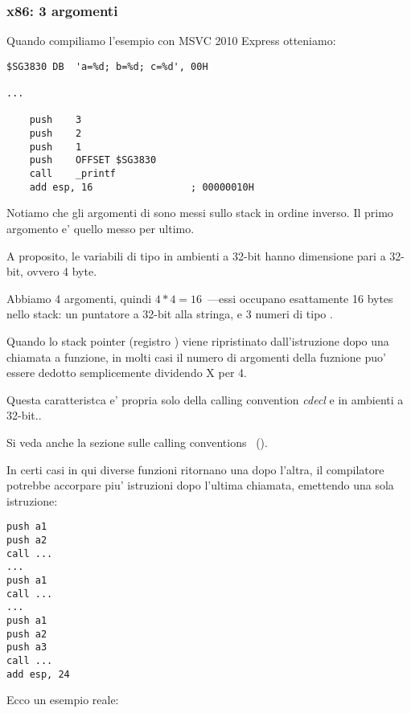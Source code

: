 \subsubsection{x86: 3 argomenti}


Quando compiliamo l'esempio con MSVC 2010 Express otteniamo:

\begin{lstlisting}[style=customasmx86]
$SG3830	DB	'a=%d; b=%d; c=%d', 00H

...

	push	3
	push	2
	push	1
	push	OFFSET $SG3830
	call	_printf
	add	esp, 16					; 00000010H
\end{lstlisting}

Notiamo che gli argomenti di \printf sono messi sullo stack in ordine inverso. Il primo argomento e' quello messo per ultimo.

A proposito, le variabili di tipo \Tint in ambienti a 32-bit hanno dimensione pari a 32-bit, ovvero 4 byte.

Abbiamo 4 argomenti, quindi $4*4 = 16$~---essi occupano esattamente 16 bytes nello stack: un puntatore a 32-bit alla stringa,  e 3 numeri di tipo \Tint.

Quando lo \gls{stack pointer} (registro \ESP) viene ripristinato dall'istruzione 
dopo una chiamata a funzione, in molti casi il numero di argomenti della fuznione puo' essere dedotto semplicemente dividendo X per 4.

Questa caratteristca  e' propria solo della calling convention \emph{cdecl} e in ambienti a 32-bit..

Si veda anche la sezione sulle calling conventions ~().

In certi casi in qui diverse funzioni ritornano una dopo l'altra, il compilatore potrebbe accorpare piu' istruzioni  
dopo l'ultima chiamata, emettendo una sola istruzione:

\begin{lstlisting}[style=customasmx86]
push a1
push a2
call ...
...
push a1
call ...
...
push a1
push a2
push a3
call ...
add esp, 24
\end{lstlisting}

Ecco un esempio reale:



